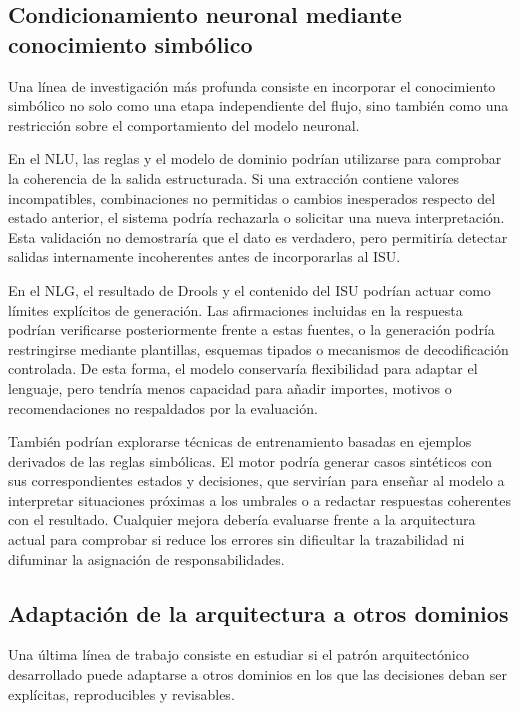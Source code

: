 \documentclass[12pt,a4paper]{report}
\begin{document}
\subsection{Condicionamiento neuronal mediante conocimiento simbólico}

Una línea de investigación más profunda consiste en incorporar el conocimiento simbólico no solo como una etapa independiente del flujo, sino también como una restricción sobre el comportamiento del modelo neuronal.

En el NLU, las reglas y el modelo de dominio podrían utilizarse para comprobar la coherencia de la salida estructurada. Si una extracción contiene valores incompatibles, combinaciones no permitidas o cambios inesperados respecto del estado anterior, el sistema podría rechazarla o solicitar una nueva interpretación. Esta validación no demostraría que el dato es verdadero, pero permitiría detectar salidas internamente incoherentes antes de incorporarlas al ISU.

En el NLG, el resultado de Drools y el contenido del ISU podrían actuar como límites explícitos de generación. Las afirmaciones incluidas en la respuesta podrían verificarse posteriormente frente a estas fuentes, o la generación podría restringirse mediante plantillas, esquemas tipados o mecanismos de decodificación controlada. De esta forma, el modelo conservaría flexibilidad para adaptar el lenguaje, pero tendría menos capacidad para añadir importes, motivos o recomendaciones no respaldados por la evaluación.

También podrían explorarse técnicas de entrenamiento basadas en ejemplos derivados de las reglas simbólicas. El motor podría generar casos sintéticos con sus correspondientes estados y decisiones, que servirían para enseñar al modelo a interpretar situaciones próximas a los umbrales o a redactar respuestas coherentes con el resultado. Cualquier mejora debería evaluarse frente a la arquitectura actual para comprobar si reduce los errores sin dificultar la trazabilidad ni difuminar la asignación de responsabilidades.

\subsection{Adaptación de la arquitectura a otros dominios}

Una última línea de trabajo consiste en estudiar si el patrón arquitectónico desarrollado puede adaptarse a otros dominios en los que las decisiones deban ser explícitas, reproducibles y revisables.
\end{document}
